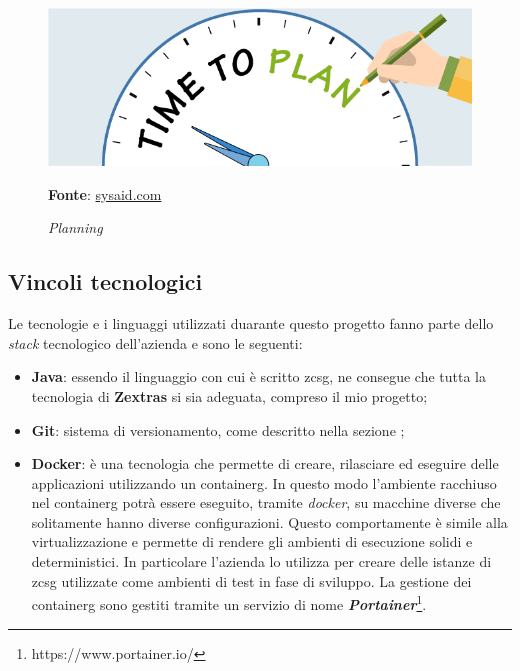     \begin{figure}[ht]
        \centering
        \includegraphics[width=1\textwidth]{immagini/plan.png}
        \caption{\textit{Planning}}
        \textbf{Fonte}:
        \href{https://www.sysaid.com/blog/entry/8-tips-on-how-to-plan-for-configuration-management-part-1}{sysaid.com}
        \label{fig: Planning}
    \end{figure}
    
    \subsection{Vincoli tecnologici}
    Le tecnologie e i linguaggi utilizzati duarante questo progetto fanno parte dello \textit{stack} tecnologico dell'azienda e sono le seguenti:
    \begin{itemize}
        \item \textbf{Java}: essendo il linguaggio con cui è scritto \gls{zcsg}, ne consegue che tutta la tecnologia di \textbf{Zextras} si sia adeguata, compreso il mio progetto;
        \item \textbf{Git}: sistema di versionamento, come descritto nella sezione ;
        \item \textbf{Docker}: è una tecnologia che permette di creare, rilasciare ed eseguire delle applicazioni utilizzando un \gls{containerg}. In questo modo l'ambiente racchiuso nel \gls{containerg} potrà essere eseguito, tramite \textit{docker}, su macchine diverse che solitamente hanno diverse configurazioni. Questo comportamente è simile alla virtualizzazione e permette di rendere gli ambienti di esecuzione solidi e deterministici. In particolare l'azienda lo utilizza per creare delle istanze di \gls{zcsg} utilizzate come ambienti di test in fase di sviluppo. La gestione dei \gls{containerg} sono gestiti tramite un servizio di nome \textbf{\textit{Portainer}}\footnote{https://www.portainer.io/}.
    \end{itemize}

